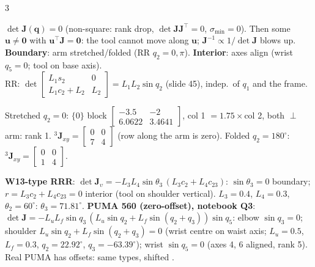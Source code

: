\begin{multicols}{3}
\begin{fbx}
$\det\mathbf J(\mathbf q)=0$ (non-square: rank drop, $\det\mathbf J\mathbf J^\top=0$, $\sigma_{\min}=0$). Then some $\mathbf u\neq\mathbf 0$ with $\mathbf u^\top\mathbf J=\mathbf 0$: the tool cannot move along $\mathbf u$; $\mathbf J^{-1}\propto1/\det\mathbf J$ blows up.\\
\textbf{Boundary}: arm stretched/folded (RR $q_2=0,\pi$). \textbf{Interior}: axes align (wrist $q_5=0$; tool on base axis).\\
RR: $\det\begin{bmatrix}L_1s_2&0\\L_1c_2+L_2&L_2\end{bmatrix}=L_1L_2\sin q_2$ (slide 45), indep.\ of $q_1$ and the frame.
\end{fbx}
\begin{worked}[RR $L=(3,4)$, $q_1=30^\circ$, singular poses (notebook cell 46)]
Stretched $q_2=0$: $\{0\}$ block $\begin{bmatrix}-3.5&-2\\6.0622&3.4641\end{bmatrix}$, col 1 $=1.75\times$col 2, both $\perp$ arm: rank 1. ${}^3\mathbf J_{xy}=\begin{bmatrix}0&0\\7&4\end{bmatrix}$ (row along the arm is zero). Folded $q_2=180^\circ$: ${}^3\mathbf J_{xy}=\begin{bmatrix}0&0\\1&4\end{bmatrix}$. \chk
\end{worked}
\begin{worked}[3D arms]
\textbf{W13-type RRR}: $\det\mathbf J_\upsilon=-L_3L_4\sin\theta_3\,(L_3c_2+L_4c_{23})$: $\sin\theta_3=0$ boundary; $r=L_3c_2+L_4c_{23}=0$ interior (tool on shoulder vertical). $L_3=0.4$, $L_4=0.3$, $\theta_2=60^\circ$: $\theta_3=71.81^\circ$. \textbf{PUMA 560 (zero-offset), notebook Q3}: $\det\mathbf J=-L_uL_f\sin q_3\,(L_u\sin q_2+L_f\sin(q_2{+}q_3))\sin q_5$: elbow $\sin q_3=0$; shoulder $L_u\sin q_2+L_f\sin(q_2{+}q_3)=0$ (wrist centre on waist axis; $L_u=0.5$, $L_f=0.3$, $q_2=22.92^\circ$, $q_3=-63.39^\circ$); wrist $\sin q_5=0$ (axes 4, 6 aligned, rank 5). Real PUMA has offsets: same types, shifted \added. \chk
\end{worked}
\begin{recipe}
\begin{enumerate}

\end{enumerate}
\end{recipe}
\end{multicols}

